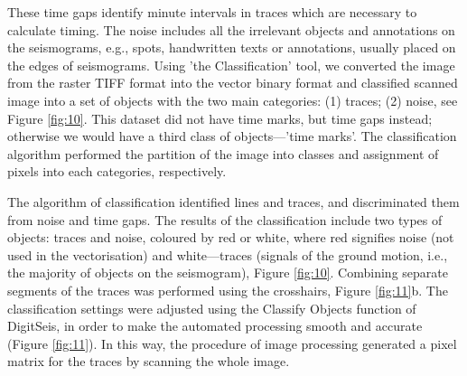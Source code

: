 \documentclass[sensors,article,accept,moreauthors,pdftex]{Definitions/mdpi}
\begin{document}
These time gaps {identify }minute intervals in traces{ which are }necessary to calculate timing. {The }noise {includes }all {the }irrelevant objects and annotations on the seismograms, e.g.{, }spots, handwritten texts or {annotations}, usually {placed }on the edges of seismograms. Using '{the }Classification' tool{, }we converted the image from {the }raster TIFF format into {the }vector binary format and classified scanned image into a set of objects with {the two }main categories: (1) traces; (2) noise{, see} Figure \ref{fig:10}. This dataset did not have time marks, but time gaps instead; otherwise we would have a third class of objects---'time marks'. The classification algorithm performed the partition of {the }image into classes and assignment of pixels into each categories{, respectively. }

{The algorithm of classification identified lines and traces}, and discriminated them from noise and time gaps. The results of the classification include two types of objects: traces and noise, coloured by red or white, where red signifies noise (not used in the vectorisation) and white---traces (signals of the ground motion, i.e.{, }the majority of objects on the seismogram), Figure \ref{fig:10}. Combining separate segments of the traces was performed using the crosshairs, \linebreak Figure \ref{fig:11}b. The classification settings were adjusted using the Classify Objects function of DigitSeis, in order to make the automated processing smooth and accurate (Figure \ref{fig:11}). In this way, the procedure of image processing generated a pixel matrix for the traces by scanning the whole image.  
\end{document}
